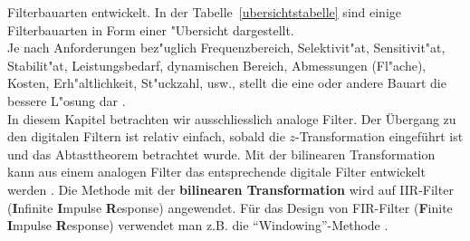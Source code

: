 Filterbauarten entwickelt. In der
Tabelle~\ref{ubersichtstabelle} sind einige Filterbauarten in Form
einer "Ubersicht dargestellt.\\ 
\nit Je nach Anforderungen bez"uglich Frequenzbereich, Selektivit"at,
Sensitivit"at, Stabilit"at, Leistungsbedarf,
dynamischen Bereich, Abmessungen (Fl"ache), Kosten,
Erh"altlichkeit, St"uckzahl, usw.,
stellt die eine oder andere Bauart die bessere L"osung dar \cite{LIN:BRA:LEH:85, MOS:89, SCH:VAL:01}.\\ 
\nit In diesem Kapitel betrachten wir ausschliesslich analoge
Filter. Der \"Ubergang zu den digitalen
Filtern ist relativ einfach, sobald die
$z$-Transformation
eingef\"uhrt ist und das Abtasttheorem betrachtet
wurde. Mit der bilinearen Transformation kann aus einem
analogen Filter das entsprechende digitale Filter entwickelt werden
\cite{OPP:SCH:89}. Die Methode mit der {\bf bilinearen Transformation} wird
auf IIR-Filter ({\bf I}nfinite {\bf I}mpulse {\bf R}esponse) angewendet. F\"ur das Design von FIR-Filter ({\bf F}inite {\bf I}mpulse {\bf R}esponse) verwendet
man z.B. die ``Windowing''-Methode \cite{ING:PRO:97}.
\clearpage
